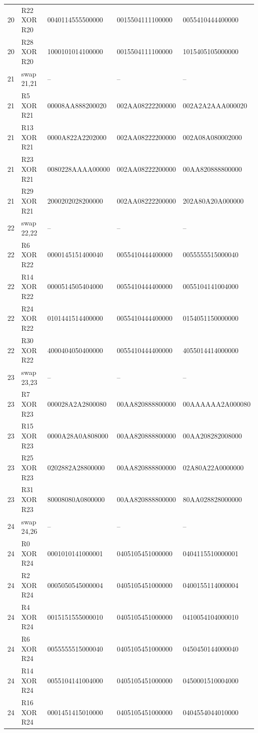 \begin{longtable}{rllll}
20 & R22 XOR R20 & 0040114555500000 & 0015504111100000 & 0055410444400000\\
20 & R28 XOR R20 & 1000101014100000 & 0015504111100000 & 1015405105000000\\
21 & swap 21,21 & -- & -- & --\\
21 & R5 XOR R21 & 00008AA888200020 & 002AA08222200000 & 002A2A2AAA000020\\
21 & R13 XOR R21 & 0000A822A2202000 & 002AA08222200000 & 002A08A080002000\\
21 & R23 XOR R21 & 0080228AAAA00000 & 002AA08222200000 & 00AA820888800000\\
21 & R29 XOR R21 & 2000202028200000 & 002AA08222200000 & 202A80A20A000000\\
22 & swap 22,22 & -- & -- & --\\
22 & R6 XOR R22 & 0000145151400040 & 0055410444400000 & 0055555515000040\\
22 & R14 XOR R22 & 0000514505404000 & 0055410444400000 & 0055104141004000\\
22 & R24 XOR R22 & 0101441514400000 & 0055410444400000 & 0154051150000000\\
22 & R30 XOR R22 & 4000404050400000 & 0055410444400000 & 4055014414000000\\
23 & swap 23,23 & -- & -- & --\\
23 & R7 XOR R23 & 000028A2A2800080 & 00AA820888800000 & 00AAAAAA2A000080\\
23 & R15 XOR R23 & 0000A28A0A808000 & 00AA820888800000 & 00AA208282008000\\
23 & R25 XOR R23 & 0202882A28800000 & 00AA820888800000 & 02A80A22A0000000\\
23 & R31 XOR R23 & 80008080A0800000 & 00AA820888800000 & 80AA028828000000\\
24 & swap 24,26 & -- & -- & --\\
24 & R0 XOR R24 & 0001010141000001 & 0405105451000000 & 0404115510000001\\
24 & R2 XOR R24 & 0005050545000004 & 0405105451000000 & 0400155114000004\\
24 & R4 XOR R24 & 0015151555000010 & 0405105451000000 & 0410054104000010\\
24 & R6 XOR R24 & 0055555515000040 & 0405105451000000 & 0450450144000040\\
24 & R14 XOR R24 & 0055104141004000 & 0405105451000000 & 0450001510004000\\
24 & R16 XOR R24 & 0001451415010000 & 0405105451000000 & 0404554044010000\\

\end{longtable}
